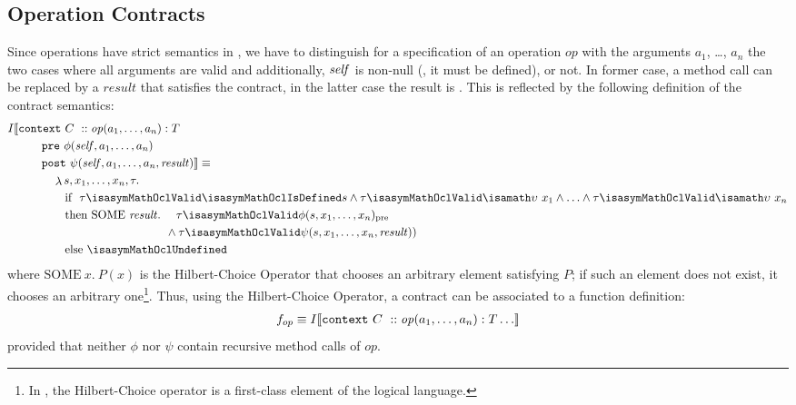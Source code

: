 \subsection{Operation Contracts}
Since operations have strict semantics in \OCL, we have to distinguish for a specification of an
operation $\mathit{op}$ with the arguments $a_1$, \ldots, $a_n$ the
two cases where all arguments are valid and additionally, $\mathit{self}$ is non-null (\ie, it must be defined), or not.
In former case, a method call can be replaced by a $\mathit{result}$
that satisfies the contract, in the latter case the result is
. This is reflected by the following definition of the contract semantics:
\begin{gather*}
\begin{aligned}
 I\semantics{& \mathtt{context}~C~:: \mathit{op}(a_1, \ldots, a_n) : T \\
                     & \qquad\mathtt{pre}~ \phi(\self, a_1, \ldots, a_n)  \\
                     & \qquad\mathtt{post}~\psi(\self, a_1, \ldots, a_n, \mathit{result})}  \equiv \\
 & \qquad \quad \lambda  s,  x_1, \ldots, x_n, \tau.  \\
 & \qquad\qquad \text{if}  ~ ~ \tau
\isasymMathOclValid \isasymMathOclIsDefined s \land \tau \isasymMathOclValid
\isasymupsilon~x_1 \land \ldots \land  \tau \isasymMathOclValid
\isasymupsilon~ x_n \\
 & \qquad\qquad \text{then} ~ \text{SOME}~ \mathit{result}. ~ ~ ~ ~\tau \isasymMathOclValid \phi(s, x_1, \ldots, x_n)_\text{pre} \\
 & \qquad\qquad\qquad\qquad\qquad\qquad ~ ~          \land \tau \isasymMathOclValid \psi(s, x_1, \ldots, x_n, \mathit{result}))\\
 &\qquad\qquad  \text{else}  ~  \isasymMathOclUndefined
\end{aligned}
\end{gather*}
where $\text{SOME}~ x. ~P(x)$ is the Hilbert-Choice Operator that
chooses an arbitrary element satisfying $P$; if such an element does not exist, it chooses
an arbitrary one\footnote{In \HOL, the Hilbert-Choice operator is a first-class element of
the logical language.}. Thus, using the Hilbert-Choice Operator, a contract can be associated
to a function definition:
\begin{gather*}
    f_{op}  \equiv I\llbracket  \mathtt{context}~C~:: \mathit{op}(a_1, \ldots, a_n) : T \ldots  \rrbracket
\end{gather*}
provided that neither $\phi$  nor $\psi$ contain recursive method calls of $\mathit{op}$.
